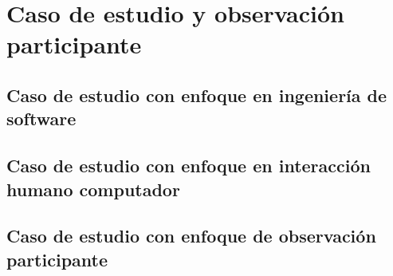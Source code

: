 
\chapter{Caso de estudio y observación participante} %

\label{capitulo4} %

\section{Caso de estudio con enfoque en ingeniería de software}
\section{Caso de estudio con enfoque en interacción humano computador}
\section{Caso de estudio con enfoque de observación participante}